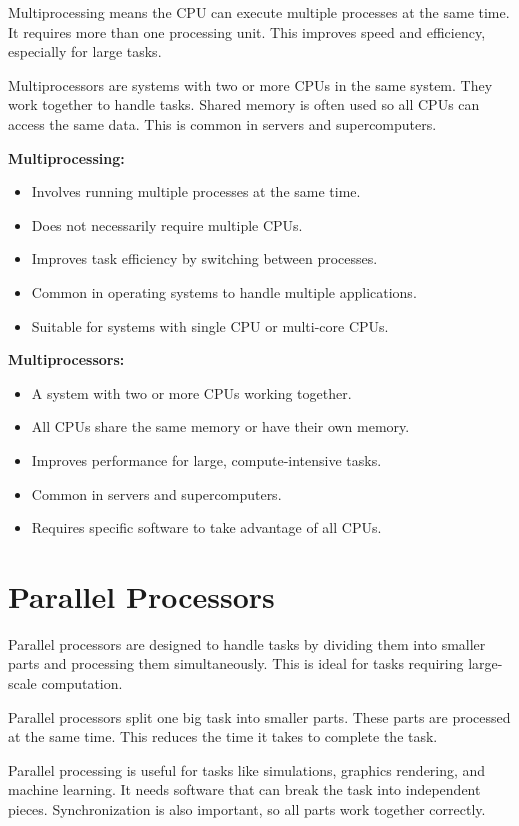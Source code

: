\documentclass[12pt]{article}
\begin{document}
Multiprocessing means the CPU can execute multiple processes at the same time. It requires more than one processing unit. This improves speed and efficiency, especially for large tasks.

Multiprocessors are systems with two or more CPUs in the same system. They work together to handle tasks. Shared memory is often used so all CPUs can access the same data. This is common in servers and supercomputers.

\begin{multicols}{2}
    \textbf{Multiprocessing:}
    \begin{itemize}
        \item Involves running multiple processes at the same time.
        \item Does not necessarily require multiple CPUs.
        \item Improves task efficiency by switching between processes.
        \item Common in operating systems to handle multiple applications.
        \item Suitable for systems with single CPU or multi-core CPUs.
    \end{itemize}
    
    \columnbreak
    
    \textbf{Multiprocessors:}
    \begin{itemize}
        \item A system with two or more CPUs working together.
        \item All CPUs share the same memory or have their own memory.
        \item Improves performance for large, compute-intensive tasks.
        \item Common in servers and supercomputers.
        \item Requires specific software to take advantage of all CPUs.
    \end{itemize}
    \end{multicols}
    
\newpage
\section*{Parallel Processors}
Parallel processors are designed to handle tasks by dividing them into smaller parts and processing them simultaneously. This is ideal for tasks requiring large-scale computation.

Parallel processors split one big task into smaller parts. These parts are processed at the same time. This reduces the time it takes to complete the task.

Parallel processing is useful for tasks like simulations, graphics rendering, and machine learning. It needs software that can break the task into independent pieces. Synchronization is also important, so all parts work together correctly.
\end{document}
